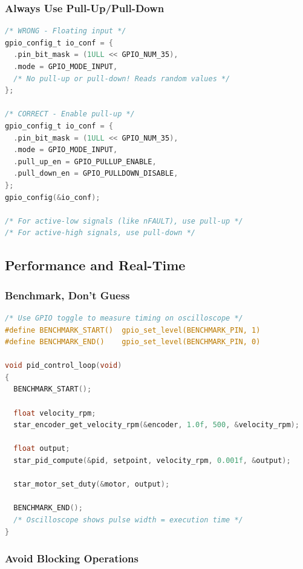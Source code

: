 \subsubsection{Always Use Pull-Up/Pull-Down}

\begin{lstlisting}[language=C]
/* WRONG - Floating input */
gpio_config_t io_conf = {
  .pin_bit_mask = (1ULL << GPIO_NUM_35),
  .mode = GPIO_MODE_INPUT,
  /* No pull-up or pull-down! Reads random values */
};

/* CORRECT - Enable pull-up */
gpio_config_t io_conf = {
  .pin_bit_mask = (1ULL << GPIO_NUM_35),
  .mode = GPIO_MODE_INPUT,
  .pull_up_en = GPIO_PULLUP_ENABLE,
  .pull_down_en = GPIO_PULLDOWN_DISABLE,
};
gpio_config(&io_conf);

/* For active-low signals (like nFAULT), use pull-up */
/* For active-high signals, use pull-down */


\end{lstlisting}
\subsection{Performance and Real-Time}

\subsubsection{Benchmark, Don't Guess}

\begin{lstlisting}[language=C]
/* Use GPIO toggle to measure timing on oscilloscope */
#define BENCHMARK_START()  gpio_set_level(BENCHMARK_PIN, 1)
#define BENCHMARK_END()    gpio_set_level(BENCHMARK_PIN, 0)

void pid_control_loop(void)
{
  BENCHMARK_START();
  
  float velocity_rpm;
  star_encoder_get_velocity_rpm(&encoder, 1.0f, 500, &velocity_rpm);
  
  float output;
  star_pid_compute(&pid, setpoint, velocity_rpm, 0.001f, &output);
  
  star_motor_set_duty(&motor, output);
  
  BENCHMARK_END();
  /* Oscilloscope shows pulse width = execution time */
}


\end{lstlisting}
\subsubsection{Avoid Blocking Operations}


